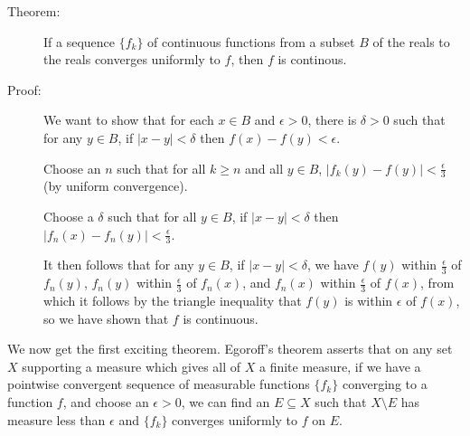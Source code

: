 \documentclass[12pt]{article}
\begin{document}
\begin{description}

\item[Theorem:]  If a sequence $\{f_k\}$ of continuous functions from a subset $B$ of the reals to the reals converges uniformly to $f$, then $f$ is continous.

\item[Proof:]  We want to show that for each $x \in B$ and $\epsilon>0$, there is $\delta>0$ such that for any $y \in B$,  if $|x-y|<\delta$ then $f(x)-f(y)<\epsilon$.

Choose an $n$ such that for all $k \geq n$ and all $y\in B$, $|f_k(y) - f(y)|<\frac\epsilon3$ (by uniform convergence).

Choose a $\delta$ such that for all $y\in B$, if $|x-y|<\delta$ then $|f_n(x)-f_n(y)|<\frac\epsilon3$.

It then follows that for any $y \in B$, if $|x-y|<\delta$, we have $f(y)$ within $ \frac\epsilon3$ of $f_n(y)$, $f_n(y)$ within $ \frac\epsilon3$ of $f_n(x)$, and 
$f_n(x)$ within $ \frac\epsilon3$ of $f(x)$, from which it follows by the triangle inequality that $f(y)$ is within $\epsilon$ of $f(x)$, so we have shown that $f$ is continuous.

\end{description}

We now get the first exciting theorem.  Egoroff's theorem asserts that on any set $X$ supporting a measure which gives all of $X$ a finite measure,
if we have a pointwise convergent sequence of measurable functions $\{f_k\}$ converging to a function $f$, and choose an $\epsilon>0$, we can find an $E \subseteq X$ such that $X \setminus E$ has measure less than $\epsilon$ and $\{f_k\}$ converges uniformly to $f$ on $E$.
\end{document}
